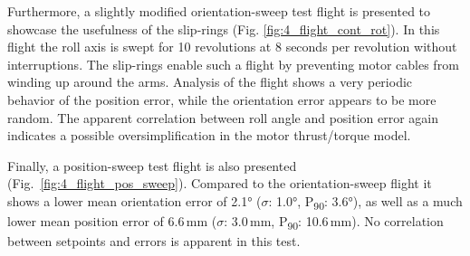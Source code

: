 \documentclass[conference]{IEEEtran}
\begin{document}
Furthermore, a slightly modified orientation-sweep test flight is presented to showcase the usefulness of the slip-rings (Fig. \ref{fig:4_flight_cont_rot}). In this flight the roll axis is swept for 10 revolutions at 8 seconds per revolution without interruptions. The slip-rings enable such a flight by preventing motor cables from winding up around the arms. Analysis of the flight shows a very periodic behavior of the position error, while the orientation error appears to be more random. The apparent correlation between roll angle and position error again indicates a possible oversimplification in the motor thrust/torque model.
\par
Finally, a position-sweep test flight is also presented \mbox{(Fig. \ref{fig:4_flight_pos_sweep})}. Compared to the orientation-sweep flight it shows a lower mean orientation error of 2.1° ($\sigma$: 1.0°, P\textsubscript{90}: 3.6°), as well as a much lower mean position error of 6.6\,mm ($\sigma$: 3.0\,mm, P\textsubscript{90}: 10.6\,mm). No correlation between setpoints and errors is apparent in this test.
\vspace*{4pt}

\end{document}
